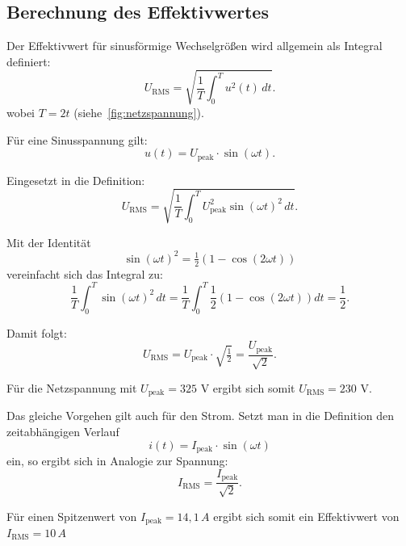 \subsection{Berechnung des Effektivwertes}
	Der Effektivwert für sinusförmige Wechselgrö{\ss}en wird allgemein als Integral definiert:
	\begin{equation}
		U_\text{RMS} = \sqrt{\frac{1}{T} \int_0^T u^2(t)\,dt}.
	\end{equation}
	wobei $T = 2t$ (siehe~\autoref{fig:netzspannung}).
	
	Für eine Sinusspannung gilt:
	\begin{equation}
		u(t) = U_\text{peak} \cdot \sin(\omega t).
	\end{equation}
	
	Eingesetzt in die Definition:
	\begin{equation}
		U_\text{RMS} = \sqrt{\frac{1}{T} \int_0^T U_\text{peak}^2 \sin(\omega t)^2\,dt}.
	\end{equation}
	
	Mit der Identität 
	\[
	\sin(\omega t)^2 = \tfrac{1}{2}\left(1 - \cos(2\omega t)\right)
	\]
	vereinfacht sich das Integral zu:
	\begin{equation}
		\frac{1}{T}\int_0^T \sin(\omega t)^2\,dt 
		= \frac{1}{T}\int_0^T \frac{1}{2}\left(1 - \cos(2\omega t)\right)dt 
		= \frac{1}{2}.
	\end{equation}
	
	Damit folgt:
	\begin{equation}
		U_\text{RMS} = U_\text{peak} \cdot \sqrt{\tfrac{1}{2}} = \frac{U_\text{peak}}{\sqrt{2}}.
	\end{equation}
	
	Für die Netzspannung mit $U_\text{peak}=325$ V ergibt sich somit $U_\text{RMS}=230$ V.

	
	Das gleiche Vorgehen gilt auch für den Strom. Setzt man in die Definition den zeitabhängigen Verlauf 
	\begin{equation}
		i(t) = I_\text{peak} \cdot \sin(\omega t)
	\end{equation}
	ein, so ergibt sich in Analogie zur Spannung:
	\begin{equation}
		I_\text{RMS} = \frac{I_\text{peak}}{\sqrt{2}}.
	\end{equation}
	
	Für einen Spitzenwert von $I_\text{peak} = 14{,}1\,A$ ergibt sich somit ein Effektivwert von $I_\text{RMS} = 10\,A$ \cite[255--256]{Stiny:2024}
	
